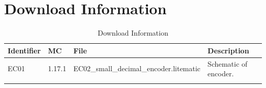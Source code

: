 \documentclass[10pt]{datasheet}
\begin{document}
\section{Download Information}
\begin{table}[h]
    \caption{Download Information}
    \begin{tabularx}{\textwidth}{l | l | l | X}
        \thickhline
        \textbf{Identifier} & \textbf{MC} & \textbf{File} & \textbf{Description} \\
        \hline
        EC01 & 1.17.1 & EC02\_small\_decimal\_encoder.litematic & Schematic of encoder. \\
        \hline
        \thickhline
    \end{tabularx}
\end{table}
\end{document}
